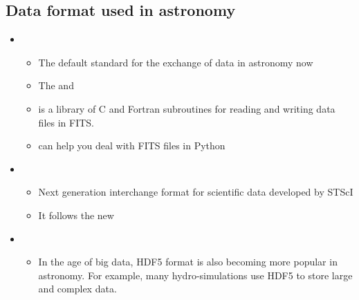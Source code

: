 \documentclass[letterpaper,10pt,english]{sphinxmanual}
\begin{document}
\subsection{Data format used in astronomy}
\label{\detokenize{resource/astro/astro_research_basic:data-format-used-in-astronomy}}\begin{itemize}
\item {} 
\begin{itemize}
\item {} 
The default standard for the exchange of data in astronomy now

\item {} 
The 
and 

\item {} 
 is a library
of C and Fortran subroutines for reading and writing data files in
FITS.

\item {} 
can help you deal with FITS files in Python

\end{itemize}

\item {} 
\begin{itemize}
\item {} 
Next generation interchange format for scientific data developed
by STScI

\item {} 
It follows the new 

\end{itemize}

\item {} 
\begin{itemize}
\item {} 
In the age of big data, HDF5 format is also becoming more popular
in astronomy. For example, many hydro-simulations use HDF5 to
store large and complex data.


\end{itemize}
\end{itemize}
\end{document}
